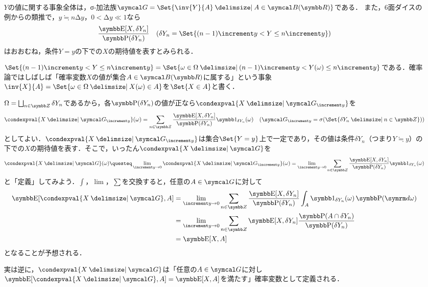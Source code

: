 \documentclass[../../main]{subfiles}
\begin{document}
\(Y\)の値に関する事象全体は，σ‐加法族\(\sigmaalg{G}=\Set{\inv{Y}{A}\given A\in\borelset{\numset{R}}}\)である．
また，6面ダイスの例からの類推で，\(y\fallingdotseq n\increment y\)，\(0<\increment y\ll 1\)なら
\[
  \frac{\expval[X,\delta Y_n]}{\prob(\delta Y_n)}\quad(\delta Y_n=\Set{(n-1)\increment y<Y\leq n\increment y})
\]
はおおむね，条件\(Y=y\)の下での\(X\)の期待値を表すとみられる．

\begin{note}
  \(\Set{(n-1)\increment y<Y\leq n\increment y}=\Set{\omega\in\Omega\given(n-1)\increment y<Y(\omega)\leq n\increment y}\)である．確率論ではしばしば「確率変数\(X\)の値が集合\(A\in\borelset{\numset{R}}\)に属する」という事象\(\inv{X}{A}=\Set{\omega\in\Omega\given X(\omega)\in A}\)を\(\Set{X\in A}\)と書く．
\end{note}

\(\Omega=\bigsqcup_{n\in\numset{Z}}\delta Y_n\)であるから，各\(\prob(\delta Y_n)\)の値が正なら\(\condexpval{X\given\sigmaalg{G}_{\increment y}}\)を
\[
  \condexpval{X\given\sigmaalg{G}_{\increment y}}(\omega) = \sum_{n\in\numset{Z}}\frac{\expval[X,\delta Y_n]}{\prob(\delta Y_n)}\indicator_{\delta Y_n}(\omega)\quad(\sigmaalg{G}_{\increment y}=\sigmagen{\Set{\delta Y_n\given n\in\numset{Z}}})
\]
としてよい．\(\condexpval{X\given\sigmaalg{G}_{\increment y}}\)は集合\(\Set{Y=y}\)上で一定であり，その値は条件\(\delta Y_n\)（つまり\(Y\fallingdotseq y\)）の下での\(X\)の期待値を表す．そこで，いったん\(\condexpval{X\given\sigmaalg{G}}\)を
\[
  \condexpval{X\given\sigmaalg{G}}(\omega) \questeq \lim_{\increment y\to 0}\condexpval{X\given\sigmaalg{G}_{\increment y}}(\omega)
  = \lim_{\increment y\to 0}\sum_{n\in\numset{Z}}\frac{\expval[X,\delta Y_n]}{\prob(\delta Y_n)}\indicator_{\delta Y_n}(\omega)
\]
と「定義」してみよう．\(\int\)，\(\lim\)，\(\sum\)を交換すると，任意の\(A\in\sigmaalg{G}\)に対して
\begin{align*}
  \expval[\condexpval{X\given\sigmaalg{G}},A] &= \lim_{\increment y\to 0}\sum_{n\in\numset{Z}}\frac{\expval[X,\delta Y_n]}{\prob(\delta Y_n)}\int_A\indicator_{\delta Y_n}(\omega)\measured[\omega]{\prob} \\
  &= \lim_{\increment y\to 0}\sum_{n\in\numset{Z}}\expval[X,\delta Y_n]\frac{\prob(A\cap\delta Y_n)}{\prob(\delta Y_n)} \\
  &= \expval[X,A]
\end{align*}
となることが予想される．

実は逆に，\(\condexpval{X\given\sigmaalg{G}}\)は「任意の\(A\in\sigmaalg{G}\)に対し\(\expval[\condexpval{X\given\sigmaalg{G}},A]=\expval[X,A]\)を満たす」確率変数として定義される．
\end{document}
